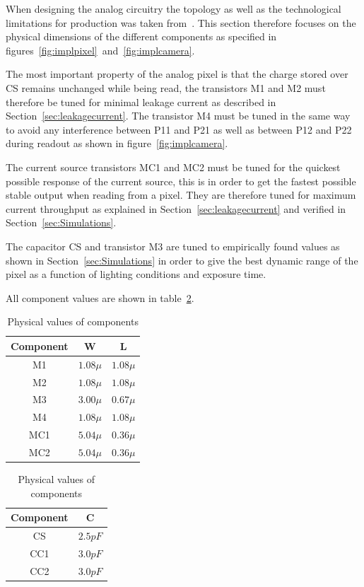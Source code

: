 When designing the analog circuitry the topology as well as the technological limitations for production was taken from~\cite{oppgave}.
This section therefore focuses on the physical dimensions of the different components as specified in figures~\ref{fig:implpixel}~and~\ref{fig:implcamera}.

The most important property of the analog pixel is that the charge stored over CS remains unchanged while being read,
the transistors M1 and M2 must therefore be tuned for minimal leakage current as described in Section~\ref{sec:leakagecurrent}.
The transistor M4 must be tuned in the same way to avoid any interference between P11 and P21 as well as between P12 and P22 during readout as shown in figure~\ref{fig:implcamera}.

The current source transistors MC1 and MC2 must be tuned for the quickest possible response of the current source, this is in order to get the fastest possible stable output when reading from a pixel.
They are therefore tuned for maximum current throughput as explained in Section~\ref{sec:leakagecurrent} and verified in Section~\ref{sec:Simulations}.

The capacitor CS and transistor M3 are tuned to empirically found values as shown in Section~\ref{sec:Simulations} in order to give the best dynamic range of the pixel
as a function of lighting conditions and exposure time.

All component values are shown in table~\ref{tab:componentvalues}.

\begin{table}[htbp]
  \centering
  \caption{Physical values of components}
  \begin{tabular}{ c | c c }
    Component & W & L \\
    \midrule
    M1 & $1.08\mu$ & $1.08\mu$ \\
    M2 & $1.08\mu$ & $1.08\mu$ \\
    M3 & $3.00\mu$ & $0.67\mu$ \\
    M4 & $1.08\mu$ & $1.08\mu$ \\
    MC1 & $5.04\mu$ & $0.36\mu$ \\
    MC2 & $5.04\mu$ & $0.36\mu$
  \end{tabular}
  \bigskip
  \begin{tabular}{c | c}
    Component & C \\
    \midrule
    CS & $2.5pF$ \\
    CC1 & $3.0pF$ \\
    CC2 & $3.0pF$
  \end{tabular} \label{tab:componentvalues}
\end{table}


